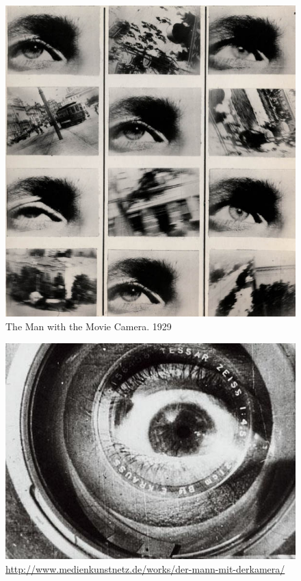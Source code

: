 \documentclass[
]{book}
\begin{document}
\begin{figure}
\centering
\includegraphics{medias/corpus/vertov/ManWAMovieCamera_1929_DzigaVertov.jpg}
\caption{The Man with the Movie Camera. 1929}
\end{figure}

\begin{figure}
\centering
\includegraphics{medias/corpus/vertov/bild.jpg}
\caption{\url{http://www.medienkunstnetz.de/works/der-mann-mit-derkamera/}}
\end{figure}
\end{document}
